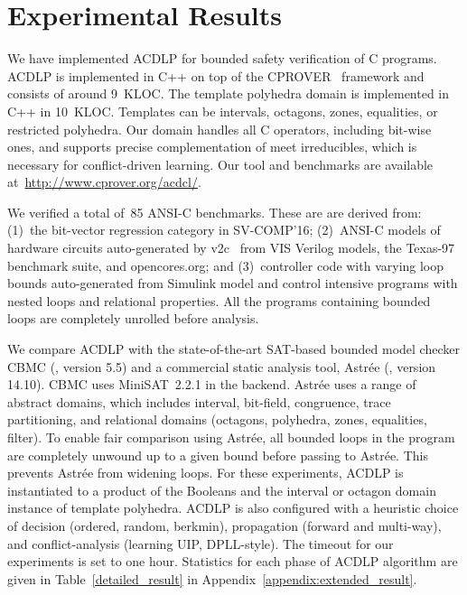 \section{Experimental Results}
%
We have implemented ACDLP for bounded safety verification of C programs.  
ACDLP is implemented in C++ on top of the
\textsc{CPROVER}~\cite{cprover} framework and consists of around 9~KLOC. 
The template polyhedra domain is implemented in C++ in 10~KLOC.  Templates
can be intervals, octagons, zones, equalities, or restricted polyhedra.  Our
domain handles all C operators, including bit-wise ones, and supports
precise complementation of meet irreducibles, which is necessary for
conflict-driven learning.  Our tool and benchmarks are available 
at~\url{http://www.cprover.org/acdcl/}.
%


We verified a total of~85 ANSI-C benchmarks.  These are are derived from:
(1)~the bit-vector regression category in SV-COMP'16; (2)~ANSI-C models of
hardware circuits auto-generated by v2c~\cite{mtk2016} from VIS Verilog
models, the Texas-97 benchmark suite, and opencores.org; and (3)~controller 
code with varying loop bounds auto-generated from Simulink model and control 
intensive programs with nested loops and relational properties. 
All the programs containing bounded loops are completely unrolled before
analysis.

We compare ACDLP with the state-of-the-art SAT-based bounded model checker
CBMC (\cite{cbmc}, version 5.5) and a commercial static analysis tool,
Astr{\'e}e (\cite{astree}, version 14.10).  CBMC uses MiniSAT~2.2.1 in the
backend.  Astr{\'e}e uses a range of abstract domains, which includes
interval, bit-field, congruence, trace partitioning, and relational domains
(octagons, polyhedra, zones, equalities, filter).  To enable fair comparison
using Astr{\'e}e, all bounded loops in the program are completely unwound up
to a given bound before passing to Astr{\'e}e.  This prevents Astr{\'e}e
from widening loops.
%
For these experiments, ACDLP is instantiated to a product of the Booleans
and the interval or octagon domain instance of template polyhedra.  ACDLP is
also configured with a heuristic choice of decision (ordered, random, berkmin), 
propagation (forward and multi-way), and conflict-analysis (learning UIP, 
DPLL-style).  The timeout for our experiments is set to one hour.  Statistics 
for each phase of ACDLP algorithm are given in Table~\ref{detailed_result} 
in Appendix~\ref{appendix:extended_result}.  
%

